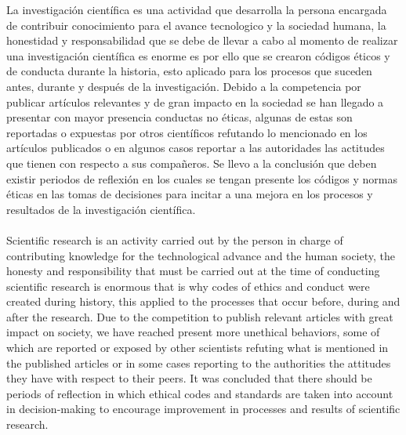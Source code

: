 La investigación científica es una actividad que desarrolla la persona encargada de contribuir conocimiento 
para el avance tecnologico y la sociedad humana, la honestidad y responsabilidad que se debe de llevar a cabo
al momento de realizar una investigación científica es enorme es por ello que se crearon códigos éticos y de conducta 
durante la historia, esto aplicado para los procesos que suceden antes, durante y después de la investigación.
Debido a la competencia por publicar artículos relevantes y de gran impacto en la sociedad se han llegado a 
presentar con mayor presencia conductas no éticas, algunas de estas son reportadas o expuestas por otros científicos 
refutando lo mencionado en los artículos publicados o en algunos casos reportar a las autoridades las actitudes
que tienen con respecto a sus compañeros. Se llevo a la conclusión que deben existir periodos de reflexión en los cuales
se tengan presente los códigos y normas éticas en las tomas de decisiones para incitar a una mejora en los procesos y resultados
de la investigación científica.\\\\
Scientific research is an activity carried out by the person in charge of contributing knowledge 
for the technological advance and the human society, the honesty and responsibility that must be carried out
at the time of conducting scientific research is enormous that is why codes of ethics and conduct were created 
during history, this applied to the processes that occur before, during and after the research.
Due to the competition to publish relevant articles with great impact on society, we have reached 
present more unethical behaviors, some of which are reported or exposed by other scientists 
refuting what is mentioned in the published articles or in some cases reporting to the authorities the attitudes
they have with respect to their peers. It was concluded that there should be periods of reflection in which
ethical codes and standards are taken into account in decision-making to encourage improvement in processes and results
of scientific research.
